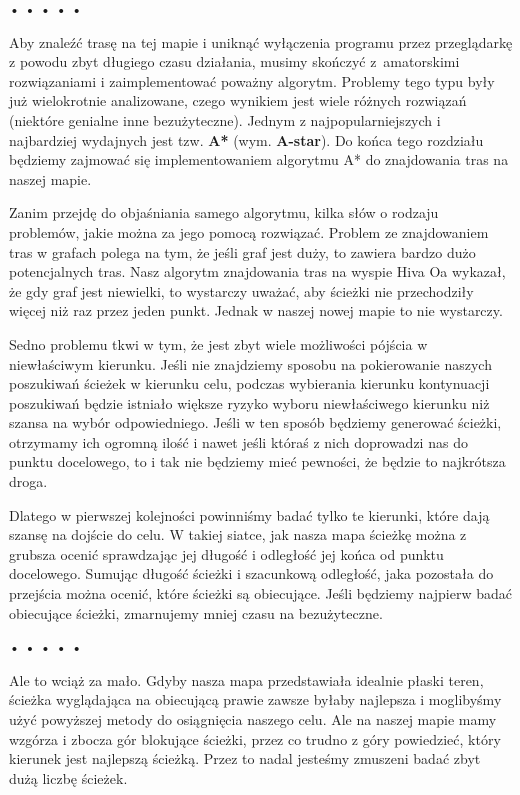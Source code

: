\begin{center}
• • • • •
\end{center}

  
Aby znaleźć trasę na tej mapie i uniknąć wyłączenia programu przez przeglądarkę z powodu zbyt długiego czasu działania, musimy skończyć z~amatorskimi rozwiązaniami i zaimplementować poważny algorytm. Problemy tego typu były już wielokrotnie analizowane, czego wynikiem jest wiele różnych rozwiązań (niektóre genialne inne bezużyteczne). Jednym z najpopularniejszych i najbardziej wydajnych jest tzw. \textbf{A*} (wym. \textbf{A-star}). Do końca tego rozdziału będziemy zajmować się implementowaniem algorytmu A* do znajdowania tras na naszej mapie.

  
Zanim przejdę do objaśniania samego algorytmu, kilka słów o rodzaju problemów, jakie można za jego pomocą rozwiązać. Problem ze znajdowaniem tras w grafach polega na tym, że jeśli graf jest duży, to zawiera bardzo dużo potencjalnych tras. Nasz algorytm znajdowania tras na wyspie Hiva Oa wykazał, że gdy graf jest niewielki, to wystarczy uważać, aby ścieżki nie przechodziły więcej niż raz przez jeden punkt. Jednak w naszej nowej mapie to nie wystarczy.

  
Sedno problemu tkwi w tym, że jest zbyt wiele możliwości pójścia w niewłaściwym kierunku. Jeśli nie znajdziemy sposobu na pokierowanie naszych poszukiwań ścieżek w kierunku celu, podczas wybierania kierunku kontynuacji poszukiwań będzie istniało większe ryzyko wyboru niewłaściwego kierunku niż szansa na wybór odpowiedniego. Jeśli w ten sposób będziemy generować ścieżki, otrzymamy ich ogromną ilość i nawet jeśli któraś z nich doprowadzi nas do punktu docelowego, to i tak nie będziemy mieć pewności, że będzie to najkrótsza droga.

  
Dlatego w pierwszej kolejności powinniśmy badać tylko te kierunki, które dają szansę na dojście do celu. W takiej siatce, jak nasza mapa ścieżkę można z grubsza ocenić sprawdzając jej długość i odległość jej końca od punktu docelowego. Sumując długość ścieżki i szacunkową odległość, jaka pozostała do przejścia można ocenić, które ścieżki są obiecujące. Jeśli będziemy najpierw badać obiecujące ścieżki, zmarnujemy mniej czasu na bezużyteczne.



\begin{center}
• • • • •
\end{center}

  
Ale to wciąż za mało. Gdyby nasza mapa przedstawiała idealnie płaski teren, ścieżka wyglądająca na obiecującą prawie zawsze byłaby najlepsza i moglibyśmy użyć powyższej metody do osiągnięcia naszego celu. Ale na naszej mapie mamy wzgórza i zbocza gór blokujące ścieżki, przez co trudno z góry powiedzieć, który kierunek jest najlepszą ścieżką. Przez to nadal jesteśmy zmuszeni badać zbyt dużą liczbę ścieżek.

